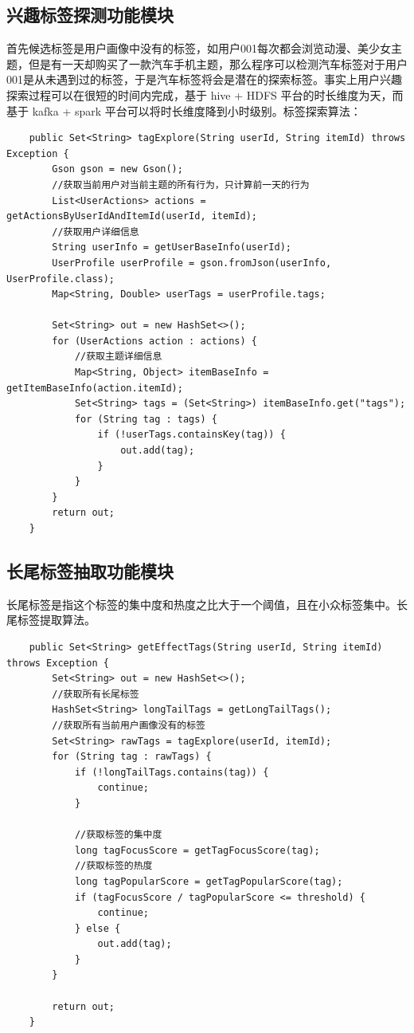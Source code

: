   \subsection{兴趣标签探测功能模块}
  首先候选标签是用户画像中没有的标签，如用户001每次都会浏览动漫、美少女主题，但是有一天却购买了一款汽车手机主题，那么程序可以检测汽车标签对于用户001是从未遇到过的标签，于是汽车标签将会是潜在的探索标签。事实上用户兴趣探索过程可以在很短的时间内完成，基于 hive + HDFS 平台的时长维度为天，而基于 kafka + spark 平台可以将时长维度降到小时级别。标签探索算法：
  \begin{lstlisting}
    public Set<String> tagExplore(String userId, String itemId) throws Exception {
        Gson gson = new Gson();
        //获取当前用户对当前主题的所有行为，只计算前一天的行为
        List<UserActions> actions = getActionsByUserIdAndItemId(userId, itemId);
        //获取用户详细信息
        String userInfo = getUserBaseInfo(userId);
        UserProfile userProfile = gson.fromJson(userInfo, UserProfile.class);
        Map<String, Double> userTags = userProfile.tags;

        Set<String> out = new HashSet<>();
        for (UserActions action : actions) {
            //获取主题详细信息
            Map<String, Object> itemBaseInfo = getItemBaseInfo(action.itemId);
            Set<String> tags = (Set<String>) itemBaseInfo.get("tags");
            for (String tag : tags) {
                if (!userTags.containsKey(tag)) {
                    out.add(tag);
                }
            }
        }
        return out;
    }
  \end{lstlisting}

  \subsection{长尾标签抽取功能模块}
  长尾标签是指这个标签的集中度和热度之比大于一个阈值，且在小众标签集中。长尾标签提取算法。
  \begin{lstlisting}
    public Set<String> getEffectTags(String userId, String itemId) throws Exception {
        Set<String> out = new HashSet<>();
        //获取所有长尾标签
        HashSet<String> longTailTags = getLongTailTags();
        //获取所有当前用户画像没有的标签
        Set<String> rawTags = tagExplore(userId, itemId);
        for (String tag : rawTags) {
            if (!longTailTags.contains(tag)) {
                continue;
            }

            //获取标签的集中度
            long tagFocusScore = getTagFocusScore(tag);
            //获取标签的热度
            long tagPopularScore = getTagPopularScore(tag);
            if (tagFocusScore / tagPopularScore <= threshold) {
                continue;
            } else {
                out.add(tag);
            }
        }

        return out;
    }
  \end{lstlisting}

